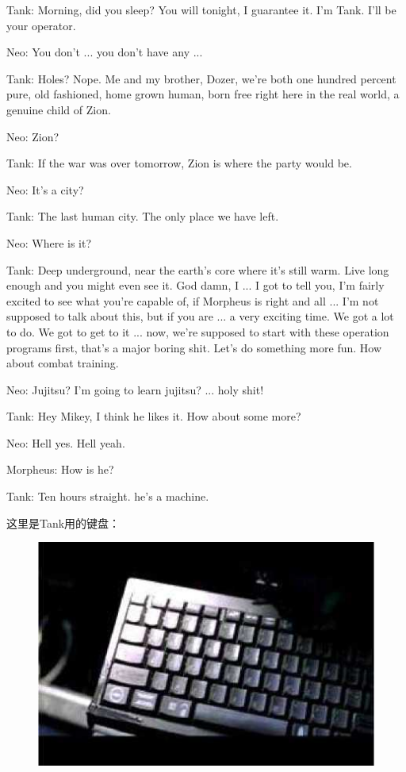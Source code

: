 \documentclass[UTF8]{ctexart}
\newenvironment{myquote}{\color{green} \setlength{\leftskip}{6em} \setlength{\rightskip}{4em} \setlength{\parindent}{-2em}}{\par}
\begin{document}
\begin{myquote}
Tank: Morning, did you sleep? You will tonight, I guarantee it. I'm Tank. I'll be your operator.

Neo: You don't ... you don't have any ...

Tank: Holes? Nope. Me and my brother, Dozer, we're both one hundred percent pure, old fashioned, home grown human, born free right here in the real world, a genuine child of Zion.

Neo: Zion?

Tank: If the war was over tomorrow, Zion is where the party would be.

Neo: It's a city?

Tank: The last human city. The only place we have left.

Neo: Where is it?

Tank: Deep underground, near the earth's core where it's still warm. Live long enough and you might even see it. God damn, I ... I got to tell you, I'm fairly excited to see what you're capable of, if Morpheus is right and all ... I'm not supposed to talk about this, but if you are ... a very exciting time. We got a lot to do. We got to get to it ... now, we're supposed to start with these operation programs first, that's a major boring shit. Let's do something more fun. How about combat training.

Neo: Jujitsu? I'm going to learn jujitsu? ... holy shit!

Tank: Hey Mikey, I think he likes it. How about some more?

Neo: Hell yes. Hell yeah.

Morpheus: How is he?

Tank: Ten hours straight. he's a machine.
\end{myquote}

这里是Tank用的键盘：

\begin{figure}[htb]
\centering
\includegraphics[width=0.5\linewidth]{fig/read_Matrix-30}
\end{figure}
\end{document}
